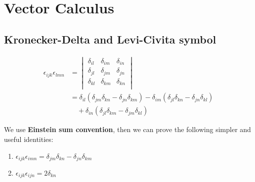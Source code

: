 \chapter{Vector Calculus}

\section{Kronecker-Delta and Levi-Civita symbol}

\begin{equation}
\begin{split}
\epsilon_{ijk} \epsilon_{lmn} &=
   \begin{vmatrix}
   \delta_{il} & \delta_{im} & \delta_{in}  \\
   \delta_{jl} & \delta_{jm} & \delta_{jn}  \\
   \delta_{kl} & \delta_{km} & \delta_{kn}  \\
   \end{vmatrix} \\
&= \delta_{il} (\delta_{jm} \delta_{kn} - \delta_{jn} \delta_{km})
 - \delta_{im} (\delta_{jl} \delta_{kn} - \delta_{jn} \delta_{kl}) \\
&\quad + \delta_{in} (\delta_{jl} \delta_{km} - \delta_{jm} \delta_{kl})
\end{split}
\end{equation}

We use \textbf{Einstein sum convention},
then we can prove the following simpler and useful identities:
\begin{enumerate}[label=(\alph*)]
\item $\epsilon_{ijk} \epsilon_{imn} = \delta_{jm}\delta_{kn} - \delta_{jn}\delta_{km}$
\item $\epsilon_{ijk} \epsilon_{ijn} = 2 \delta_{kn}$
\end{enumerate}

